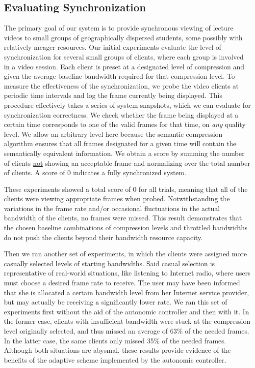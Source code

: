 \documentclass{sig-alternate}
\begin{document}
\subsection{Evaluating Synchronization}

The primary goal of our system is to provide synchronous viewing of
lecture videos to small groups of geographically dispersed students,
some possibly with relatively meager resources.  Our initial
experiments evaluate the level of synchronization for several small
groups of clients, where each group is involved in a video session.
Each client is preset at a designated level of compression and given
the average baseline bandwidth required for that compression level.
To measure the effectiveness of the synchronization, we probe the
video clients at periodic time intervals and log the frame currently
being displayed.  This procedure effectively takes a series of system
snapshots, which we can evaluate for synchronization correctness.  We
check whether the frame being displayed at a certain time corresponds
to one of the valid frames for that time, on {\em any} quality level.
We allow an arbitrary level here because the semantic compression
algorithm ensures that all frames designated for a given time will
contain the semantically equivalent information.  We obtain a score by
summing the number of clients \underline{not} showing an acceptable
frame and normalizing over the total number of clients.  A score of 0
indicates a fully synchronized system.

These experiments showed a total score of 0 for all trials, meaning
that all of the clients were viewing appropriate frames when probed.
Notwithstanding the variations in the frame rate and/or occasional
fluctuations in the actual bandwidth of the clients, no frames were
missed.  This result demonstrates that the chosen baseline
combinations of compression levels and throttled bandwidths do not
push the clients beyond their bandwidth resource capacity.

Then we ran another set of experiments, in which the clients were
assigned more casually selected levels of starting bandwidths.  Said
casual selection is representative of real-world situations, like
listening to Internet radio, where users must choose a desired frame
rate to receive.  The user may have been informed that she is
allocated a certain bandwidth level from her Internet service
provider, but may actually be receiving a significantly lower rate.
We ran this set of experiments first without the aid of the autonomic
controller and then with it. In the former case, clients with
insufficient bandwidth were stuck at the compression level originally
selected, and thus missed an average of 63\% of the needed frames.  In
the latter case, the same clients only missed 35\% of the needed
frames.  Although both situations are abysmal, these results provide
evidence of the benefits of the adaptive scheme implemented by the
autonomic controller.
\end{document}
